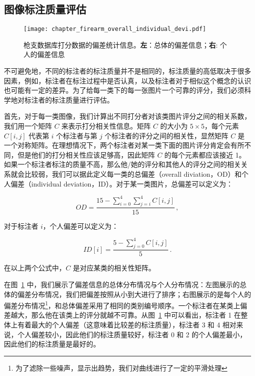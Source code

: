 \subsection{图像标注质量评估}

\begin{figure}[t]
	\centering
	\texttt{[image: chapter\_firearm\_overall\_individual\_devi.pdf]}
	\caption[枪支数据库打分数据的偏差统计信息]{枪支数据库打分数据的偏差统计信息。\textbf{左}：总体的偏差信息；\textbf{右}: 个人的偏差信息}
	\label{fig:deviation_info}
\end{figure}

不可避免地，不同的标注者的标注质量并不是相同的，标注质量的高低取决于很多因素，例如，标注者在标注过程中是否认真，以及标注者对于相似这个概念的认识也可能有一定的差异。为了给每一类下的每一张图片一个可靠的评分，我们必须科学地对标注者的标注质量进行评估。

首先，对于每一类图像，我们计算出不同打分者对该类图片评分之间的相关系数，我们用一个矩阵 $C$ 来表示打分相关性信息。矩阵 $C$ 的大小为 $5 \times 5$，每个元素 $C[i,j]$ 代表第 $i$ 个标注者与第 $j$ 个标注者的评分之间的相关性，显然矩阵 $C$ 是一个对称矩阵。在理想情况下，两个标注者对某一类下面的图片评分肯定会有所不同，但是他们的打分相关性应该足够高，因此矩阵 $C$ 的每个元素都应该接近 1。如果一个标注者标注的质量不高，那么他/她的评分和其他人的评分之间的相关关系就会比较弱，我们可以据此定义每一类的总偏差（overall diviation，OD）和个人偏差（individual deviation，ID）。对于某一类图片，总偏差可以定义为：

\begin{equation}
OD = \frac{15 - \sum_{i=0}^{4}\sum_{j=i}^{4}C[i,j]}{15}\, ,
\end{equation}

对于标注者 $i$，个人偏差可以定义为：

\begin{equation}
	ID[i] = \frac{5 - \sum_{j=0}^{4}C[i, j]}{5}\, .
\end{equation}

在以上两个公式中，$C$ 是对应某类的相关性矩阵。

在图~\ref{fig:deviation_info} 中，我们展示了偏差信息的总体分布情况与个人分布情况：左图展示的总体的偏差分布情况，我们把偏差按照从小到大进行了排序；右图展示的是每个人的偏差分布情况\footnote{为了滤除一些噪声，显示出趋势，我们对曲线进行了一定的平滑处理}，和总体偏差采用了相同的类别编号顺序。一个标注者在某类上偏差越大，那么他在该类上的评分就越不可靠。从图~\ref{fig:deviation_info} 中可以看出，标注者 1 在整体上有着最大的个人偏差（这意味着比较差的标注质量），标注者 3 和 4 相对来说，个人偏差较小，因此他们的标注质量较好，标注者 0 和 2 的个人偏差最小，因此他们的标注质量是最好的。

